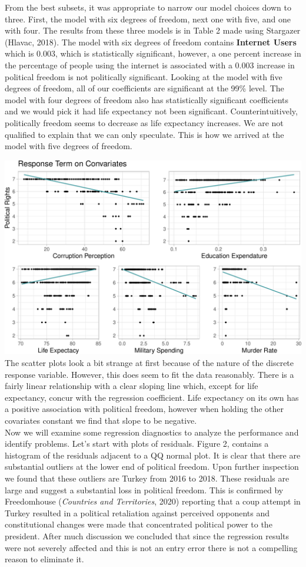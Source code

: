 \documentclass[
  english,
  man,floatsintext]{apa6}
\begin{document}
From the best subsets, it was appropriate to narrow our model choices down to three. First, the model with six degrees of freedom, next one with five, and one with four. The results from these three models is in Table 2 made using Stargazer (Hlavac, 2018). The model with six degrees of freedom contains \textbf{Internet Users} which is 0.003, which is statistically significant, however, a one percent increase in the percentage of people using the internet is associated with a 0.003 increase in political freedom is not politically significant. Looking at the model with five degrees of freedom, all of our coefficients are significant at the 99\% level. The model with four degrees of freedom also has statistically significant coefficients and we would pick it had life expectancy not been significant. Counterintuitively, politically freedom seems to decrease as life expectancy increases. We are not qualified to explain that we can only speculate. This is how we arrived at the model with five degrees of freedom.

\includegraphics{paper_files/figure-latex/unnamed-chunk-5-1.pdf}
The scatter plots look a bit strange at first because of the nature of the discrete response variable. However, this does seem to fit the data reasonably. There is a fairly linear relationship with a clear sloping line which, except for life expectancy, concur with the regression coefficient. Life expectancy on its own has a positive association with political freedom, however when holding the other covariates constant we find that slope to be negative.\\
Now we will examine some regression diagnostics to analyze the performance and identify problems. Let's start with plots of residuals. Figure 2, contains a histogram of the residuals adjacent to a QQ normal plot. It is clear that there are substantial outliers at the lower end of political freedom. Upon further inspection we found that these outliers are Turkey from 2016 to 2018. These residuals are large and suggest a substantial loss in political freedom. This is confirmed by Freedomhouse (\emph{Countries and Territories}, 2020) reporting that a coup attempt in Turkey resulted in a political retaliation against perceived opponents and constitutional changes were made that concentrated political power to the president. After much discussion we concluded that since the regression results were not severely affected and this is not an entry error there is not a compelling reason to eliminate it.
\end{document}
